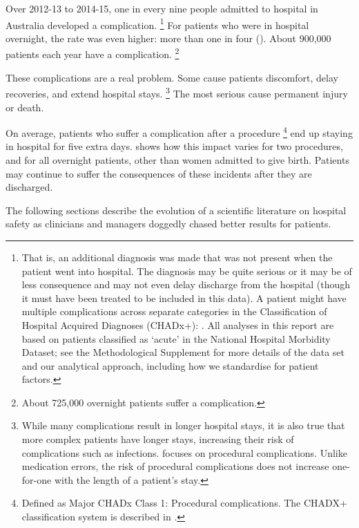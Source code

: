 \documentclass[FrontPage]{grattan}
\begin{document}
Over 2012-13 to 2014-15, one in every nine people admitted to hospital in Australia developed a complication.%
	\footnote{That is, an additional diagnosis was made that was not present when the patient went into hospital.
	The diagnosis may be quite serious or it may be of less consequence and may not even delay discharge from the hospital (though it must have been treated to be included in this data).
	A patient might have multiple complications across separate categories in the Classification of Hospital Acquired Diagnoses (CHADx+): \textcite{jackson2009classification}.
	All analyses in this report are based on patients classified as `acute' in the National Hospital Morbidity Dataset; see the Methodological Supplement for more details of the data set and our analytical approach, including how we standardise for patient factors.}
For patients who were in hospital overnight, the rate was even higher: more than one in four ().
About 900,000 patients each year have a complication.%
	\footnote{About 725,000 overnight patients suffer a complication.}


These complications are a real problem.
Some cause patients discomfort, delay recoveries, and extend hospital stays.%
	\footnote{While many complications result in longer hospital stays, it is also true that more complex patients have longer stays, increasing their risk of complications such as infections.
	 focuses on procedural complications. Unlike medication errors, the risk of procedural complications does not increase one-for-one with the length of a patient's stay.}
The most serious cause permanent injury or death.

On average, patients who suffer a complication after a procedure%
	\footnote{Defined as Major CHADx Class 1: Procedural complications.
	The CHADX+ classification system is described in .}
end up staying in hospital for five extra days.
 shows how this impact varies for two procedures, and for all overnight patients, other than women admitted to give birth.
Patients may continue to suffer the consequences of these incidents after they are discharged.

The following sections describe the evolution of a scientific literature on hospital safety as clinicians and managers doggedly chased better results for patients.
\end{document}
